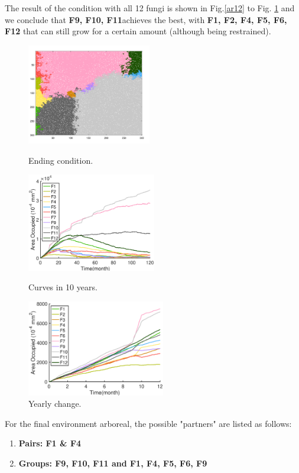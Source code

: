 \documentclass[a4paper,12pt]{article}
\begin{document}
The result of the condition with all 12 fungi is shown in Fig.\ref{ar12} to Fig. \ref{yar12} and we conclude that \textbf{F9, F10, F11}achieves the best, with \textbf{F1, F2, F4, F5, F6, F12} that can still grow for a certain amount (although being restrained).
\begin{figure}[H]
	\begin{minipage}{29ex}
	\includegraphics[height=4.4cm]{./formal/arboreal/12[1].png}
	\caption{Ending condition.}
	\label{ar12}
\end{minipage}   
\begin{minipage}{31ex}
	\includegraphics[height=4.3cm]{./formal/arboreal/12[2].eps}
	\caption{Curves in 10 years.}
	\label{ar}
\end{minipage}
\begin{minipage}{29ex}
 \quad
	\includegraphics[height=4.2cm]{./formal/arboreal/12[3].eps}
	\caption{Yearly change.}
	\label{yar12}
\end{minipage} 
\end{figure}


For the final environment arboreal, the possible "partners" are listed as follows:
\begin{enumerate}
\setlength{\itemsep}{0ex} %
\item \textbf{Pairs: F1 \& F4 }
\item \textbf{Groups: F9, F10, F11 and F1, F4, F5, F6, F9}
\end{enumerate}
\end{document}
